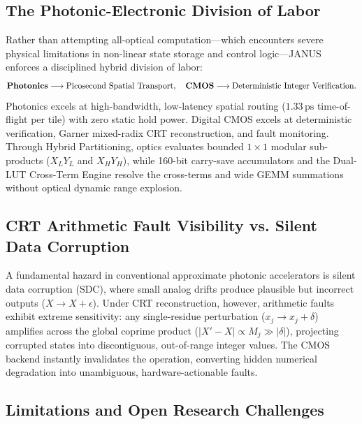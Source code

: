 \documentclass[journal]{IEEEtran}
\begin{document}
\subsection{\textbf{The Photonic-Electronic Division of Labor}}

Rather than attempting all-optical computation---which encounters severe physical limitations in non-linear state storage and control logic---JANUS enforces a disciplined hybrid division of labor:
\begin{equation}
\text{\textbf{Photonics}} \longrightarrow \text{Picosecond Spatial Transport}, \quad \text{\textbf{CMOS}} \longrightarrow \text{Deterministic Integer Verification}.
\end{equation}
Photonics excels at high-bandwidth, low-latency spatial routing ($1.33\,\mathrm{ps}$ time-of-flight per tile) with zero static hold power. Digital CMOS excels at deterministic verification, Garner mixed-radix CRT reconstruction, and fault monitoring. Through Hybrid Partitioning, optics evaluates bounded $1 \times 1$ modular sub-products ($X_L Y_L$ and $X_H Y_H$), while 160-bit carry-save accumulators and the Dual-LUT Cross-Term Engine resolve the cross-terms and wide GEMM summations without optical dynamic range explosion.

\subsection{\textbf{CRT Arithmetic Fault Visibility vs. Silent Data Corruption}}

A fundamental hazard in conventional approximate photonic accelerators is silent data corruption (SDC), where small analog drifts produce plausible but incorrect outputs ($X \to X + \epsilon$). Under CRT reconstruction, however, arithmetic faults exhibit extreme sensitivity: any single-residue perturbation ($x_j \to x_j + \delta$) amplifies across the global coprime product ($|X' - X| \propto M_j \gg |\delta|$), projecting corrupted states into discontiguous, out-of-range integer values. The CMOS backend instantly invalidates the operation, converting hidden numerical degradation into unambiguous, hardware-actionable faults.

\subsection{\textbf{Limitations and Open Research Challenges}}
\label{sec:open_challenges}
\end{document}
